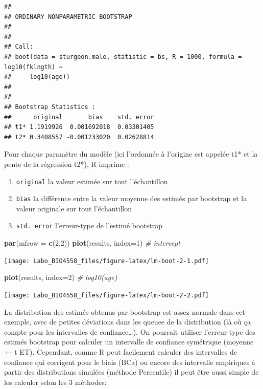 \documentclass[12pt,]{book}
\newenvironment{Shaded}{\begin{snugshade}}{\end{snugshade}}
\newcommand{\CommentTok}[1]{\textcolor[rgb]{0.37,0.37,0.37}{\textit{#1}}}
\newcommand{\DataTypeTok}[1]{\textcolor[rgb]{0.27,0.27,0.27}{#1}}
\newcommand{\DecValTok}[1]{\textcolor[rgb]{0.06,0.06,0.06}{#1}}
\newcommand{\KeywordTok}[1]{\textcolor[rgb]{0.27,0.27,0.27}{\textbf{#1}}}
\newcommand{\NormalTok}[1]{#1}
\providecommand{\tightlist}{%
  \setlength{\itemsep}{0pt}\setlength{\parskip}{0pt}}
\begin{document}
\begin{verbatim}
## 
## ORDINARY NONPARAMETRIC BOOTSTRAP
## 
## 
## Call:
## boot(data = sturgeon.male, statistic = bs, R = 1000, formula = log10(fklngth) ~ 
##     log10(age))
## 
## 
## Bootstrap Statistics :
##      original       bias    std. error
## t1* 1.1919926  0.001692018  0.03301405
## t2* 0.3408557 -0.001233020  0.02628814
\end{verbatim}

Pour chaque paramètre du modèle (ici l'ordonnée à l'origine est
appelée t1* et la pente de la régression t2*), R imprime :

\begin{enumerate}
\def\labelenumi{\arabic{enumi}.}
\tightlist
\item
  \texttt{original} la valeur estimée sur tout l'échantillon
\item
  \texttt{bias} la différence entre la valeur moyenne des estimés par bootstrap et la valeur originale sur tout l'échantillon
\item
  \texttt{std.\ error} l'erreur-type de l'estimé bootstrap
\end{enumerate}

\begin{Shaded}
\begin{Highlighting}[]
\KeywordTok{par}\NormalTok{(}\DataTypeTok{mfrow =} \KeywordTok{c}\NormalTok{(}\DecValTok{2}\NormalTok{,}\DecValTok{2}\NormalTok{))}
\KeywordTok{plot}\NormalTok{(results, }\DataTypeTok{index=}\DecValTok{1}\NormalTok{) }\CommentTok{# intercept}
\end{Highlighting}
\end{Shaded}

\texttt{[image: Labo\_BIO4558\_files/figure-latex/lm-boot-2-1.pdf]}

\begin{Shaded}
\begin{Highlighting}[]
\KeywordTok{plot}\NormalTok{(results, }\DataTypeTok{index=}\DecValTok{2}\NormalTok{) }\CommentTok{# log10(age)}
\end{Highlighting}
\end{Shaded}

\texttt{[image: Labo\_BIO4558\_files/figure-latex/lm-boot-2-2.pdf]}

La distribution des estimés obtenus par bootstrap est assez normale dans cet exemple, avec de petites déviations dans les queuee de la distribution (là où ça compte pour les intervalles de confiance\ldots{}). On pourrait utiliser l'erreur-type des estimés bootstrap pour calculer un intervalle de confiance symétrique (moyenne +- t ET). Cependant, comme R peut facilement calculer des intervalles de confiance qui corrigent pour le biais (BCa) ou encore des intervalle empiriques à partir des distributions simulées (méthode Percentile) il peut être aussi simple de les calculer selon les 3 méthodes:
\end{document}
